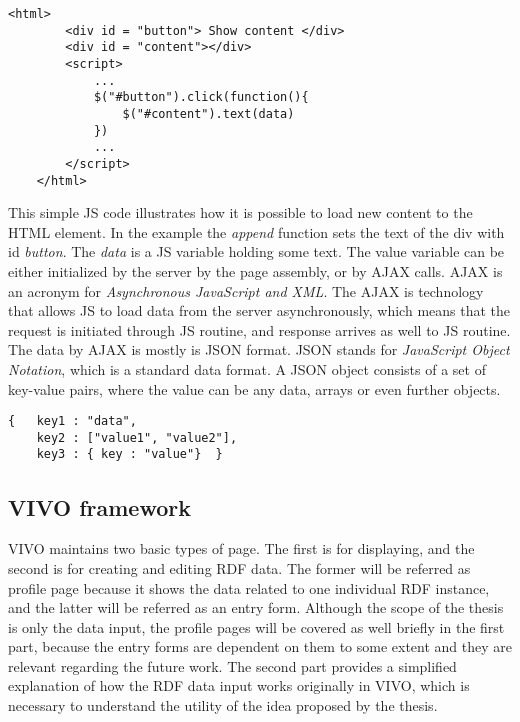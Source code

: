 \newpage
\begin{lstlisting}[captionpos=b, caption=JavaScript routine assigned to an HTML element, label=jsListing, belowskip=1em, aboveskip=2em,
basicstyle=\footnotesize,frame=single]
	<html>
		<div id = "button"> Show content </div>
		<div id = "content"></div>
		<script>
			...
			$("#button").click(function(){
				$("#content").text(data)
			})
			...	
		</script>
	</html>
\end{lstlisting}

This simple JS code illustrates how it is possible to load new content to the HTML element. In the example the \textit{append} function sets the text of the div with id \textit{button}. The \textit{data} is a JS variable holding
some text. The value variable can be either initialized by the server by the page assembly, or by AJAX calls. AJAX is an acronym for \textit{Asynchronous JavaScript and XML}. The AJAX is technology that allows JS to load data from the server asynchronously, which means that the request is initiated through JS routine, and response arrives as well to JS routine. The data by AJAX is mostly is JSON format. JSON stands for \textit{JavaScript Object Notation}, which is a standard data format. A JSON object consists of a set of key-value pairs, where the value can be any data, arrays or even further objects.

\begin{lstlisting}[captionpos=b, caption=JSON object example, label=jsListing, belowskip=1em, aboveskip=2em,
basicstyle=\footnotesize,frame=single]
{	key1 : "data",
	key2 : ["value1", "value2"],
	key3 : { key : "value"}  }
\end{lstlisting}


\subsection{VIVO framework} \label{vivo}

VIVO maintains two basic types of page. The first is for displaying, and the second is for creating and editing RDF data. The former will be referred as profile page because it shows the data related to one individual RDF instance, and the latter will be referred as an entry form. Although the scope of the thesis is only the data input, the profile pages will be covered as well briefly in the first part, because the entry forms are dependent on them to some extent and they are relevant regarding the future work. The second part provides a simplified explanation of how the RDF data input works originally in VIVO, which is necessary to understand the utility of the idea proposed by the thesis.

